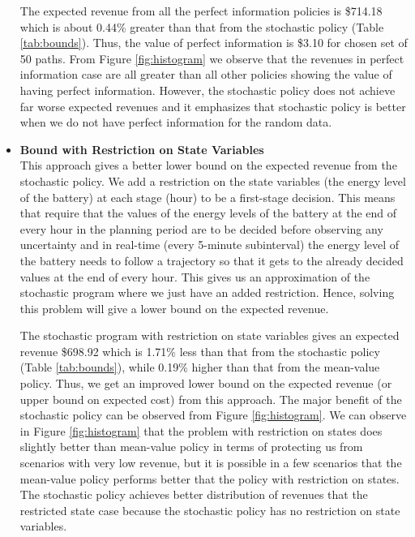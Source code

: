 \documentclass[11pt,twoside]{article}
\begin{document}
\begin{itemize}
The expected revenue from all the perfect information policies is \$714.18 which is about 0.44\% greater than that from the stochastic policy (Table \ref{tab:bounds}). Thus, the value of perfect information is \$3.10 for chosen set of 50 paths. From Figure \ref{fig:histogram} we observe that the revenues in perfect information case are all greater than all other policies showing the value of having perfect information. However, the stochastic policy does not achieve far worse expected revenues and it emphasizes that stochastic policy is better when we do not have perfect information for the random data. 

\item \textbf{Bound with Restriction on State Variables}\\
This approach gives a better lower bound on the expected revenue from the stochastic policy. We add a restriction on the state variables (the energy level of the battery) at each stage (hour) to be a first-stage decision. This means that require that the values of the energy levels of the battery at the end of every hour in the planning period are to be decided before observing any uncertainty and in real-time (every 5-minute subinterval) the energy level of the battery needs to follow a trajectory so that it gets to the already decided values at the end of every hour. This gives us an approximation of the stochastic program where we just have an added restriction. Hence, solving this problem will give a lower bound on the expected revenue.

The stochastic program with restriction on state variables gives an expected revenue \$698.92 which is 1.71\% less than that from the stochastic policy (Table \ref{tab:bounds}), while 0.19\% higher than that from the mean-value policy. Thus, we get an improved lower bound on the expected revenue (or upper bound on expected cost) from this approach. The major benefit of the stochastic policy can be observed from Figure \ref{fig:histogram}. We can observe in Figure \ref{fig:histogram} that the problem with restriction on states does slightly better than mean-value policy in terms of protecting us from scenarios with very low revenue, but it is possible in a few scenarios that the mean-value policy performs better that the policy with restriction on states. The stochastic policy achieves better distribution of revenues that the restricted state case because the stochastic policy has no restriction on state variables.
\end{itemize}
\end{document}

